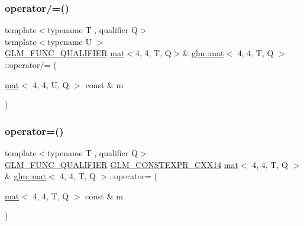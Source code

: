 \subsubsection{\texorpdfstring{operator/=()}{operator/=()}\hspace{0.1cm}{\footnotesize\ttfamily [4/4]}}
{\footnotesize\ttfamily template$<$typename T , qualifier Q$>$ \\
template$<$typename U $>$ \\
\hyperlink{setup_8hpp_a33fdea6f91c5f834105f7415e2a64407}{G\+L\+M\+\_\+\+F\+U\+N\+C\+\_\+\+Q\+U\+A\+L\+I\+F\+I\+ER} \hyperlink{structglm_1_1mat}{mat}$<$4, 4, T, Q$>$\& \hyperlink{structglm_1_1mat}{glm\+::mat}$<$ 4, 4, T, Q $>$\+::operator/= (\begin{DoxyParamCaption}\item[{\hyperlink{structglm_1_1mat}{mat}$<$ 4, 4, U, Q $>$ const \&}]{m }\end{DoxyParamCaption})}

\mbox{\label{structglm_1_1mat_3_014_00_014_00_01_t_00_01_q_01_4_a4319e1de5928bc4747e149b160ba5d9a}} 
\subsubsection{\texorpdfstring{operator=()}{operator=()}\hspace{0.1cm}{\footnotesize\ttfamily [1/3]}}
{\footnotesize\ttfamily template$<$typename T , qualifier Q$>$ \\
\hyperlink{setup_8hpp_a33fdea6f91c5f834105f7415e2a64407}{G\+L\+M\+\_\+\+F\+U\+N\+C\+\_\+\+Q\+U\+A\+L\+I\+F\+I\+ER} \hyperlink{setup_8hpp_a4dd12abf5e1164bc57f3a34671d03844}{G\+L\+M\+\_\+\+C\+O\+N\+S\+T\+E\+X\+P\+R\+\_\+\+C\+X\+X14} \hyperlink{structglm_1_1mat}{mat}$<$ 4, 4, T, Q $>$ \& \hyperlink{structglm_1_1mat}{glm\+::mat}$<$ 4, 4, T, Q $>$\+::operator= (\begin{DoxyParamCaption}\item[{\hyperlink{structglm_1_1mat}{mat}$<$ 4, 4, T, Q $>$ const \&}]{m }\end{DoxyParamCaption})}

\mbox{\label{structglm_1_1mat_3_014_00_014_00_01_t_00_01_q_01_4_a240690716d4c5dc0b562b051b5fc71af}} 
